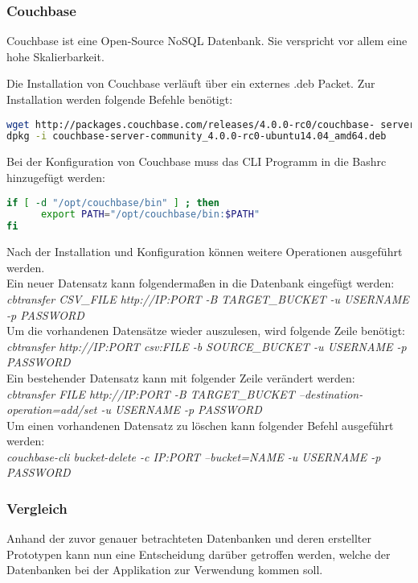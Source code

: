 \subsubsection{Couchbase}
Couchbase ist eine Open-Source NoSQL Datenbank. Sie verspricht vor allem eine hohe Skalierbarkeit.\cite{ABOUTCOUCHBASE}

Die Installation von Couchbase verläuft über ein externes .deb Packet. Zur Installation werden folgende Befehle benötigt:
\begin{lstlisting}[caption=Installation von Couchbase \cite{COUCHBASEINSTALL}, language=bash]
wget http://packages.couchbase.com/releases/4.0.0-rc0/couchbase- server-community_4.0.0-rc0-ubuntu14.04_amd64.deb
dpkg -i couchbase-server-community_4.0.0-rc0-ubuntu14.04_amd64.deb
\end{lstlisting}

Bei der Konfiguration von Couchbase muss das CLI Programm in die Bashrc hinzugefügt werden:
\begin{lstlisting}[caption=Konfiguration von Couchbase, language=bash]
if [ -d "/opt/couchbase/bin" ] ; then 
      export PATH="/opt/couchbase/bin:$PATH" 
fi
\end{lstlisting}

Nach der Installation und Konfiguration können weitere Operationen ausgeführt werden.\\
Ein neuer Datensatz kann folgendermaßen in die Datenbank eingefügt werden:\\
\textit{cbtransfer CSV\_FILE http://IP:PORT -B TARGET\_BUCKET  -u USERNAME -p PASSWORD}\\
Um die vorhandenen Datensätze wieder auszulesen, wird folgende Zeile benötigt:\\
\textit{cbtransfer http://IP:PORT csv:FILE -b SOURCE\_BUCKET  -u USERNAME -p PASSWORD}\\
Ein bestehender Datensatz kann mit folgender Zeile verändert werden:\\
\textit{cbtransfer FILE http://IP:PORT -B TARGET\_BUCKET  --destination-operation=add/set -u USERNAME -p PASSWORD}\\
Um einen vorhandenen Datensatz zu löschen kann folgender Befehl ausgeführt werden:\\
\textit{couchbase-cli bucket-delete -c IP:PORT  --bucket=NAME  -u USERNAME -p PASSWORD}

\subsubsection{Vergleich}
Anhand der zuvor genauer betrachteten Datenbanken und deren erstellter Prototypen kann nun eine Entscheidung darüber getroffen werden, welche der Datenbanken bei der Applikation zur Verwendung kommen soll.

